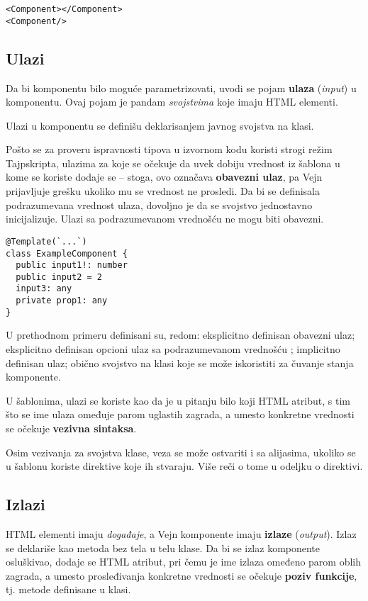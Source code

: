 \begin{verbatim}
<Component></Component>
<Component/>
\end{verbatim}

\subsection{Ulazi}

Da bi komponentu bilo moguće parametrizovati, uvodi se pojam  \textbf{ulaza} (\textsl{input}) u komponentu.
Ovaj pojam je pandam \emph{svojstvima} koje imaju HTML elementi.

Ulazi u komponentu se definišu deklarisanjem javnog svojstva na klasi.

Pošto se za proveru ispravnosti tipova u izvornom kodu koristi strogi režim Tajpskripta, ulazima za koje se očekuje da uvek dobiju vrednost iz šablona u kome se koriste dodaje se \code{!} -- stoga, ovo označava \textbf{obavezni ulaz}, pa Vejn prijavljuje grešku ukoliko mu se vrednost ne prosledi.
Da bi se definisala podrazumevana vrednost ulaza, dovoljno je da se svojstvo jednostavno inicijalizuje.
Ulazi sa podrazumevanom vrednošću ne mogu biti obavezni.

\begin{verbatim}
@Template(`...`)
class ExampleComponent {
  public input1!: number
  public input2 = 2
  input3: any
  private prop1: any
}
\end{verbatim}

U prethodnom primeru definisani su, redom: eksplicitno definisan obavezni ulaz; eksplicitno definisan opcioni ulaz sa podrazumevanom vrednošću ; implicitno definisan ulaz; obično svojstvo na klasi koje se može iskoristiti za čuvanje stanja komponente.

U šablonima, ulazi se koriste kao da je u pitanju bilo koji HTML atribut, s tim što se ime ulaza omeđuje parom uglastih zagrada, a umesto konkretne vrednosti se očekuje \textbf{vezivna sintaksa}.

Osim vezivanja za svojstva klase, veza se može ostvariti i sa alijasima, ukoliko se u šablonu koriste direktive koje ih stvaraju.
Više reči o tome u odeljku o  direktivi.

\subsection{Izlazi}

HTML elementi imaju \emph{događaje}, a Vejn komponente imaju \textbf{izlaze} (\textsl{output}).
Izlaz se deklariše kao metoda bez tela u telu klase.
Da bi se izlaz komponente osluškivao, dodaje se HTML atribut, pri čemu je ime izlaza omeđeno parom oblih zagrada, a umesto prosleđivanja konkretne vrednosti se očekuje \textbf{poziv funkcije}, tj. metode definisane u klasi.

